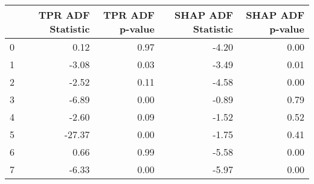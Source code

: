 \begin{tabular}{lrrrr}
\toprule
 & TPR ADF Statistic & TPR ADF p-value & SHAP ADF Statistic & SHAP ADF p-value \\
\midrule
0 & 0.12 & 0.97 & -4.20 & 0.00 \\
1 & -3.08 & 0.03 & -3.49 & 0.01 \\
2 & -2.52 & 0.11 & -4.58 & 0.00 \\
3 & -6.89 & 0.00 & -0.89 & 0.79 \\
4 & -2.60 & 0.09 & -1.52 & 0.52 \\
5 & -27.37 & 0.00 & -1.75 & 0.41 \\
6 & 0.66 & 0.99 & -5.58 & 0.00 \\
7 & -6.33 & 0.00 & -5.97 & 0.00 \\
\bottomrule
\end{tabular}
